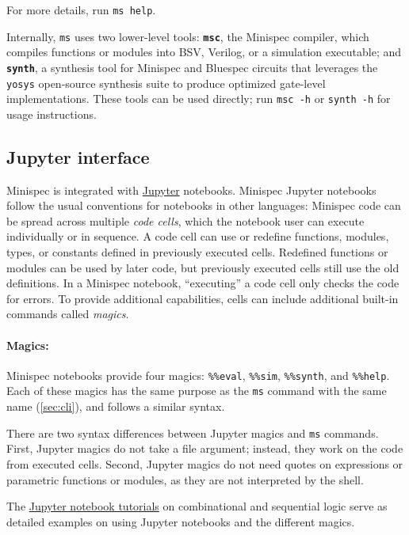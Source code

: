 For more details, run \verb|ms help|.

Internally, \verb|ms| uses two lower-level tools:
\textbf{\texttt{msc}}, the Minispec compiler, which compiles functions or modules into BSV, Verilog, or a simulation executable;
and \textbf{\texttt{synth}}, a synthesis tool for Minispec and Bluespec circuits that leverages the \verb|yosys| open-source synthesis suite
to produce optimized gate-level implementations.
These tools can be used directly; run \texttt{msc -h}
or \texttt{synth -h} for usage instructions.

\subsection{Jupyter interface} 

Minispec is integrated with \href{https://jupyter.org/}{Jupyter} notebooks.
Minispec Jupyter notebooks follow the usual conventions for notebooks in other languages:
Minispec code can be spread across multiple \emph{code cells},
which the notebook user can execute individually or in sequence.
A code cell can use or redefine functions, modules, types, or constants defined in previously executed cells.
Redefined functions or modules can be used by later code,
but previously executed cells still use the old definitions.
In a Minispec notebook, ``executing'' a code cell only checks the code for errors.
To provide additional capabilities, %
cells can include additional built-in commands called \emph{magics}.

\paragraph{Magics:} Minispec notebooks provide four magics:
\texttt{\%\%eval}, \texttt{\%\%sim}, \texttt{\%\%synth}, and \texttt{\%\%help}.
Each of these magics has the same purpose as the \texttt{ms} command with the same name (\autoref{sec:cli}),
and follows a similar syntax.

There are two syntax differences between Jupyter magics and \texttt{ms} commands.
First, Jupyter magics do not take a file argument;
instead, they work on the code from executed cells.
Second, Jupyter magics do not need quotes on expressions
or parametric functions or modules, as they are not interpreted by the shell.

The \href{https://6004.mit.edu/web/fall19/resources}{Jupyter notebook tutorials} on combinational and sequential logic
serve as detailed examples on using Jupyter notebooks and the different magics.

